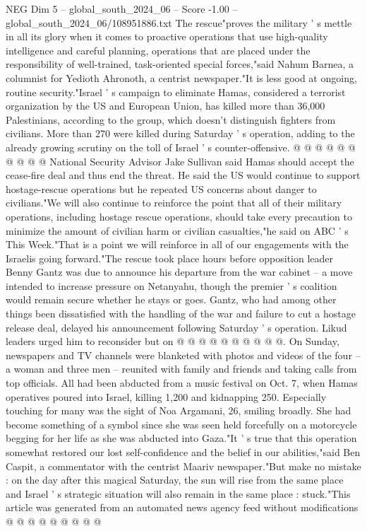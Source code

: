 \begin{textsample}{NEG Dim 5 – global\_south\_2024\_06 – Score -1.00 – global\_south\_2024\_06/108951886.txt}
The rescue"proves the military ' s mettle in all its glory when it comes to proactive operations that use high-quality intelligence and careful planning, operations that are placed under the responsibility of well-trained, task-oriented special forces,"said Nahum Barnea, a columnist for Yedioth Ahronoth, a centrist newspaper."It is less good at ongoing, routine security."Israel ' s campaign to eliminate Hamas, considered a terrorist organization by the US and European Union, has killed more than 36,000 Palestinians, according to the group, which doesn't distinguish fighters from civilians.
More than 270 were killed during Saturday ' s operation, adding to the already growing scrutiny on the toll of Israel ' s counter-offensive. @ @ @ @ @ @ @ @ @ @ National Security Advisor Jake Sullivan said Hamas should accept the cease-fire deal and thus end the threat.
He said the US would continue to support hostage-rescue operations but he repeated US concerns about danger to civilians."We will also continue to reinforce the point that all of their military operations, including hostage rescue operations, should take every precaution to minimize the amount of civilian harm or civilian casualties,"he said on ABC ' s This Week."That is a point we will reinforce in all of our engagements with the Israelis going forward."The rescue took place hours before opposition leader Benny Gantz was due to announce his departure from the war cabinet -- a move intended to increase pressure on Netanyahu, though the premier ' s coalition would remain secure whether he stays or goes.
Gantz, who had among other things been dissatisfied with the handling of the war and failure to cut a hostage release deal, delayed his announcement following Saturday ' s operation.
Likud leaders urged him to reconsider but on @ @ @ @ @ @ @ @ @ @.
On Sunday, newspapers and TV channels were blanketed with photos and videos of the four -- a woman and three men -- reunited with family and friends and taking calls from top officials.
All had been abducted from a music festival on Oct. 7, when Hamas operatives poured into Israel, killing 1,200 and kidnapping 250.
Especially touching for many was the sight of Noa Argamani, 26, smiling broadly.
She had become something of a symbol since she was seen held forcefully on a motorcycle begging for her life as she was abducted into Gaza."It ' s true that this operation somewhat restored our lost self-confidence and the belief in our abilities,"said Ben Caspit, a commentator with the centrist Maariv newspaper."But make no mistake : on the day after this magical Saturday, the sun will rise from the same place and Israel ' s strategic situation will also remain in the same place : stuck."This article was generated from an automated news agency feed without modifications @ @ @ @ @ @ @ @ @

\end{textsample}
